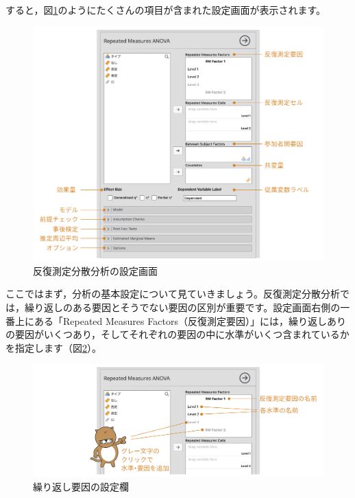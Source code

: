 \documentclass[
  12pt,
  a5jpaper,
  lualatex, ja=standard]{bxjsbook}
\begin{document}
すると，図\ref{fig:ANOVA-rm-setting}のようにたくさんの項目が含まれた設定画面が表示されます。

\begin{figure}[!ht]

{\centering \includegraphics[width=1\linewidth]{images/ANOVA/rm-setting} 

}

\caption{反復測定分散分析の設定画面}\label{fig:ANOVA-rm-setting}
\end{figure}

ここではまず，分析の基本設定について見ていきましょう。反復測定分散分析では，繰り返しのある要因とそうでない要因の区別が重要です。設定画面右側の一番上にある「Repeated Measures Factors（反復測定要因）」には，繰り返しありの要因がいくつあり，そしてそれぞれの要因の中に水準がいくつ含まれているかを指定します（図\ref{fig:ANOVA-rm-rmfactor}）。

\begin{figure}[!ht]

{\centering \includegraphics[width=1\linewidth]{images/ANOVA/rm-rmfactor} 

}

\caption{繰り返し要因の設定欄}\label{fig:ANOVA-rm-rmfactor}
\end{figure}
\end{document}
